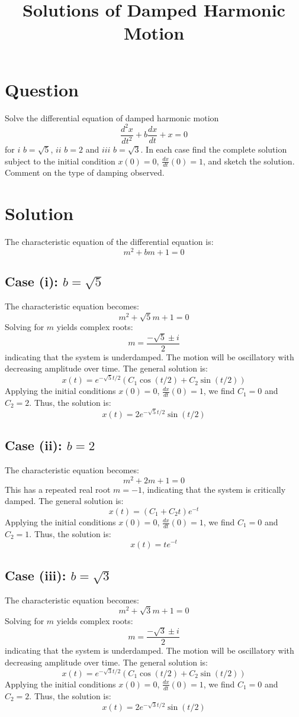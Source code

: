 \documentclass{article}
\begin{document}
\title{Solutions of Damped Harmonic Motion}
\date{}
\maketitle

\section*{Question}
Solve the differential equation of damped harmonic motion
\[ \frac{d^2x}{dt^2} + b\frac{dx}{dt} + x = 0 \]
for \(i\) \(b = \sqrt{5}\), \(ii\) \(b = 2\) and \(iii\) \(b = \sqrt{3}\). In each case find the complete solution subject to the initial condition \(x(0) = 0\), \(\frac{dx}{dt}(0) = 1\), and sketch the solution. Comment on the type of damping observed.

\section*{Solution}
The characteristic equation of the differential equation is:
\[ m^2 + bm + 1 = 0 \]

\subsection*{Case (i): \(b = \sqrt{5}\)}
The characteristic equation becomes:
\[ m^2 + \sqrt{5}m + 1 = 0 \]
Solving for \(m\) yields complex roots:
\[ m = \frac{-\sqrt{5} \pm i}{2} \]
indicating that the system is underdamped. The motion will be oscillatory with decreasing amplitude over time.
The general solution is:
\[ x(t) = e^{-\sqrt{5}t/2}(C_1 \cos(t/2) + C_2 \sin(t/2)) \]
Applying the initial conditions \(x(0) = 0\), \(\frac{dx}{dt}(0) = 1\), we find \(C_1 = 0\) and \(C_2 = 2\).
Thus, the solution is:
\[ x(t) = 2e^{-\sqrt{5}t/2} \sin(t/2) \]

\subsection*{Case (ii): \(b = 2\)}
The characteristic equation becomes:
\[ m^2 + 2m + 1 = 0 \]
This has a repeated real root \(m = -1\), indicating that the system is critically damped. The general solution is:
\[ x(t) = (C_1 + C_2t) e^{-t} \]
Applying the initial conditions \(x(0) = 0\), \(\frac{dx}{dt}(0) = 1\), we find \(C_1 = 0\) and \(C_2 = 1\).
Thus, the solution is:
\[ x(t) = t e^{-t} \]

\subsection*{Case (iii): \(b = \sqrt{3}\)}
The characteristic equation becomes:
\[ m^2 + \sqrt{3}m + 1 = 0 \]
Solving for \(m\) yields complex roots:
\[ m = \frac{-\sqrt{3} \pm i}{2} \]
indicating that the system is underdamped. The motion will be oscillatory with decreasing amplitude over time.
The general solution is:
\[ x(t) = e^{-\sqrt{3}t/2}(C_1 \cos(t/2) + C_2 \sin(t/2)) \]
Applying the initial conditions \(x(0) = 0\), \(\frac{dx}{dt}(0) = 1\), we find \(C_1 = 0\) and \(C_2 = 2\).
Thus, the solution is:
\[ x(t) = 2e^{-\sqrt{3}t/2} \sin(t/2) \]
\end{document}
